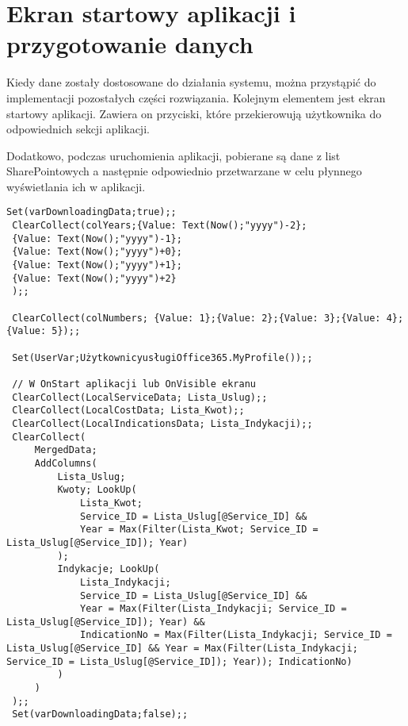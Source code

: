 \section{Ekran startowy aplikacji i przygotowanie danych}
Kiedy dane zostały dostosowane do działania systemu, można przystąpić do implementacji pozostałych części rozwiązania. 
Kolejnym elementem jest ekran startowy aplikacji. Zawiera on przyciski, które przekierowują użytkownika do odpowiednich sekcji aplikacji. 


Dodatkowo, podczas uruchomienia aplikacji, pobierane są dane z list SharePointowych a następnie odpowiednio przetwarzane w celu płynnego wyświetlania ich w aplikacji.

\begin{lstlisting}[style=MyStyle]
    Set(varDownloadingData;true);;
 ClearCollect(colYears;{Value: Text(Now();"yyyy")-2};
 {Value: Text(Now();"yyyy")-1};
 {Value: Text(Now();"yyyy")+0};
 {Value: Text(Now();"yyyy")+1};
 {Value: Text(Now();"yyyy")+2}
 );;
 
 ClearCollect(colNumbers; {Value: 1};{Value: 2};{Value: 3};{Value: 4};{Value: 5});;
 
 Set(UserVar;UżytkownicyusługiOffice365.MyProfile());;
 
 // W OnStart aplikacji lub OnVisible ekranu
 ClearCollect(LocalServiceData; Lista_Uslug);;
 ClearCollect(LocalCostData; Lista_Kwot);;
 ClearCollect(LocalIndicationsData; Lista_Indykacji);;
 ClearCollect(
     MergedData;
     AddColumns(
         Lista_Uslug;
         Kwoty; LookUp(
             Lista_Kwot;
             Service_ID = Lista_Uslug[@Service_ID] &&
             Year = Max(Filter(Lista_Kwot; Service_ID = Lista_Uslug[@Service_ID]); Year)
         );
         Indykacje; LookUp(
             Lista_Indykacji;
             Service_ID = Lista_Uslug[@Service_ID] &&
             Year = Max(Filter(Lista_Indykacji; Service_ID = Lista_Uslug[@Service_ID]); Year) &&
             IndicationNo = Max(Filter(Lista_Indykacji; Service_ID = Lista_Uslug[@Service_ID] && Year = Max(Filter(Lista_Indykacji; Service_ID = Lista_Uslug[@Service_ID]); Year)); IndicationNo)
         )
     )
 );;
 Set(varDownloadingData;false);;
\end{lstlisting}
